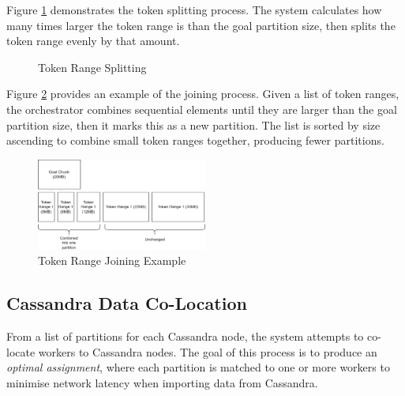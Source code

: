 Figure \ref{fig:cassandra-split-process} demonstrates the token splitting process. The system calculates how many times larger the token range is than the goal partition size, then splits the token range evenly by that amount.

\begin{figure}[h]
	\centering
	\qquad
	\caption{Token Range Splitting}
	\label{fig:cassandra-split-process}
\end{figure}

Figure \ref{fig:cassandra-join-process} provides an example of the joining process. Given a list of token ranges, the orchestrator combines sequential elements until they are larger than the goal partition size, then it marks this as a new partition. The list is sorted by size ascending to combine small token ranges together, producing fewer partitions.

\begin{figure}[h]
	\centering
	\includegraphics[width=0.5\textwidth]{chapters/diagrams/implementation/cassandra-join-example}
	\caption{Token Range Joining Example}
	\label{fig:cassandra-join-process}
\end{figure}


\subsection{Cassandra Data Co-Location}\label{subsec:colocation}
From a list of partitions for each Cassandra node, the system attempts to co-locate workers to Cassandra nodes. The goal of this process is to produce an \textit{optimal assignment}, where each partition is matched to one or more workers to minimise network latency when importing data from Cassandra.

